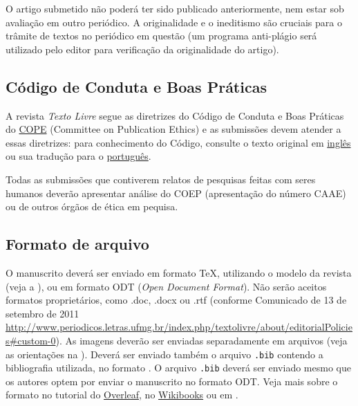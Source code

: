 \documentclass[anonymous=true]{textolivre}
\begin{document}
O artigo submetido não poderá ter sido publicado anteriormente, nem estar sob avaliação em outro periódico. 
A originalidade e o ineditismo são cruciais para o trâmite de textos no periódico 
em questão (um programa anti-plágio será utilizado pelo editor para verificação da originalidade do artigo). 


\subsection{Código de Conduta e Boas Práticas}\label{sec-conduta}
A revista \textit{Texto Livre} segue as diretrizes do Código de Conduta e Boas Práticas do 
\href{http://publicationethics.org/}{COPE} (Committee on Publication Ethics) 
e as submissões devem atender a essas diretrizes: para conhecimento do Código, 
consulte o texto original em \href{http://publicationethics.org/files/Code_of_conduct_for_journal_editors_1.pdf}{inglês} 
ou sua tradução para o \href{http://www.periodicos.letras.ufmg.br/CCBP-COPE.pdf}{português}.

Todas as submissões que contiverem relatos de pesquisas feitas com seres humanos deverão apresentar análise do COEP (apresentação do número CAAE) ou de outros órgãos de ética em pequisa.


\subsection{Formato de arquivo}\label{sec-formato}
O manuscrito deverá ser enviado em formato \TeX{}, utilizando o modelo da revista (veja a ),
ou em formato ODT (\textit{Open Document Format}). Não serão aceitos formatos proprietários, como .doc, .docx ou .rtf
(conforme Comunicado de 13 de setembro de 2011 \url{http://www.periodicos.letras.ufmg.br/index.php/textolivre/about/editorialPolicies#custom-0}). 
As imagens deverão ser enviadas separadamente em arquivos (veja as orientações na ).
Deverá ser enviado também o arquivo \texttt{.bib} contendo a bibliografia utilizada, no formato .
O arquivo \texttt{.bib} deverá ser enviado mesmo que os autores optem por enviar o manuscrito no formato ODT.
Veja mais sobre o formato no tutorial do \href{https://www.overleaf.com/learn/latex/Bibliography_management_in_LaTeX#The_bibliography_file}{Overleaf},
no \href{https://en.wikibooks.org/wiki/LaTeX/Bibliography_Management}{Wikibooks} ou em \textcite{araujo2020}.
\end{document}
